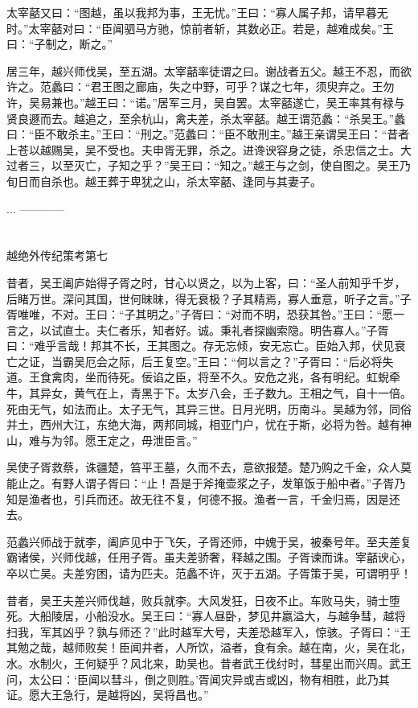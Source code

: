 \documentclass[12pt,UTF8]{ctexbook}
\begin{document}
太宰嚭又曰：“图越，虽以我邦为事，王无忧。”王曰：“寡人属子邦，请早暮无时。”太宰嚭对曰：“臣闻驷马方驰，惊前者斩，其数必正。若是，越难成矣。”王曰：“子制之，断之。”

居三年，越兴师伐吴，至五湖。太宰嚭率徒谓之曰。谢战者五父。越王不忍，而欲许之。范蠡曰：“君王图之廊庙，失之中野，可乎？谋之七年，须臾弃之。王勿许，吴易兼也。”越王曰：“诺。”居军三月，吴自罢。太宰嚭遂亡，吴王率其有禄与贤良遯而去。越追之，至余杭山，禽夫差，杀太宰嚭。越王谓范蠡：“杀吴王。”蠡曰：“臣不敢杀主。”王曰：“刑之。”范蠡曰：“臣不敢刑主。”越王亲谓吴王曰：“昔者上苍以越赐吴，吴不受也。夫申胥无罪，杀之。进谗谀容身之徒，杀忠信之士。大过者三，以至灭亡，子知之乎？”吴王曰：“知之。”越王与之剑，使自图之。吴王乃旬日而自杀也。越王葬于卑犹之山，杀太宰嚭、逢同与其妻子。

...
------------

\part{}

越绝外传纪策考第七

昔者，吴王阖庐始得子胥之时，甘心以贤之，以为上客，曰：“圣人前知乎千岁，后睹万世。深问其国，世何昧昧，得无衰极？子其精焉，寡人垂意，听子之言。”子胥唯唯，不对。王曰：“子其明之。”子胥曰：“对而不明，恐获其咎。”王曰：“愿一言之，以试直士。夫仁者乐，知者好。诚。秉礼者探幽索隐。明告寡人。”子胥曰：“难乎言哉！邦其不长，王其图之。存无忘倾，安无忘亡。臣始入邦，伏见衰亡之证，当霸吴厄会之际，后王复空。”王曰：“何以言之？”子胥曰：“后必将失道。王食禽肉，坐而待死。佞谄之臣，将至不久。安危之兆，各有明纪。虹蜺牵牛，其异女，黄气在上，青黑于下。太岁八会，壬子数九。王相之气，自十一倍。死由无气，如法而止。太子无气，其异三世。日月光明，历南斗。吴越为邻，同俗并土，西州大江，东绝大海，两邦同城，相亚门户，忧在于斯，必将为咎。越有神山，难与为邻。愿王定之，毋泄臣言。”

吴使子胥救蔡，诛疆楚，笞平王墓，久而不去，意欲报楚。楚乃购之千金，众人莫能止之。有野人谓子胥曰：“止！吾是于斧掩壶浆之子，发箪饭于船中者。”子胥乃知是渔者也，引兵而还。故无往不复，何德不报。渔者一言，千金归焉，因是还去。

范蠡兴师战于就李，阖庐见中于飞矢，子胥还师，中媿于吴，被秦号年。至夫差复霸诸侯，兴师伐越，任用子胥。虽夫差骄奢，释越之围。子胥谏而诛。宰嚭谀心，卒以亡吴。夫差穷困，请为匹夫。范蠡不许，灭于五湖。子胥策于吴，可谓明乎！

昔者，吴王夫差兴师伐越，败兵就李。大风发狂，日夜不止。车败马失，骑士堕死。大船陵居，小船没水。吴王曰：“寡人昼卧，梦见井嬴溢大，与越争彗，越将扫我，军其凶乎？孰与师还？”此时越军大号，夫差恐越军入，惊骇。子胥曰：“王其勉之哉，越师败矣！臣闻井者，人所饮，溢者，食有余。越在南，火，吴在北，水。水制火，王何疑乎？风北来，助吴也。昔者武王伐纣时，彗星出而兴周。武王问，太公曰：‘臣闻以彗斗，倒之则胜。’胥闻灾异或吉或凶，物有相胜，此乃其证。愿大王急行，是越将凶，吴将昌也。”
\end{document}
